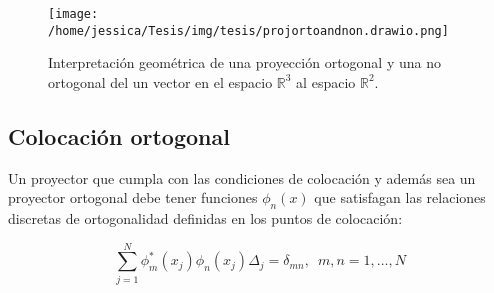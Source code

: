 \begin{figure}[ht]
  \centering
\texttt{[image: /home/jessica/Tesis/img/tesis/projortoandnon.drawio.png]}
\caption{Interpretación geométrica de una proyección ortogonal y una no ortogonal del un vector en el espacio $\mathbb{R}^3$ al espacio $\mathbb{R}^2$. }
\label{fig:projortoandnon}
\end{figure}

\subsection{Colocación ortogonal}

Un proyector que cumpla con las condiciones de colocación y además sea un proyector ortogonal debe tener funciones $\phi_n(x)$ que satisfagan las relaciones discretas de ortogonalidad definidas en los puntos de colocación: \cite{Tannor:2006}

\begin{equation}
  \label{eq:ortox2}
  \sum_{j=1}^N \phi_m^*(x_j)\phi_n(x_j)\Delta_j = \delta_{mn}, \,\,\, m,n=1,\dots,N
\end{equation}

